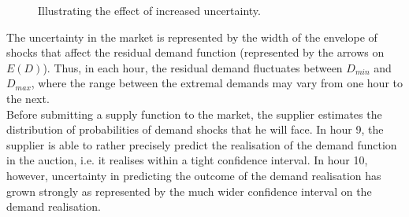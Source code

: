 \begin{figure}[!ht]
\begin{center}  \end{center}
\caption{Illustrating the effect of increased uncertainty.}
\label{predictslope}
\end{figure}

The uncertainty in the market is represented %
 by the width of the envelope of shocks that affect the residual demand function (represented by the arrows on $E(D)$). Thus, in each hour, the residual demand fluctuates between $D_{min}$ and $D_{max}$, where the range between the extremal demands may vary from one hour to the next. \\
 
Before submitting a supply function to the market, the supplier estimates the distribution of probabilities of demand shocks that he will face.  %
In hour 9, the supplier is able to rather precisely predict the realisation of the demand function in the auction, i.e. it realises within a tight confidence interval. In hour 10, however, uncertainty in predicting the outcome of the demand realisation has grown strongly as represented by the much wider confidence interval on the demand realisation. \\

